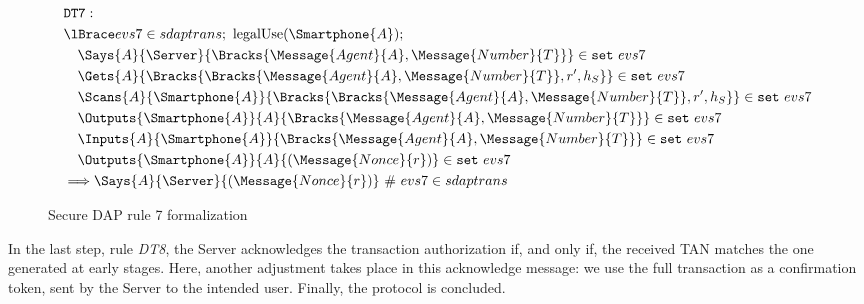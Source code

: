 \begin{figure}[!h]
  \begin{align*}
    & \texttt{DT7}: \newline \\
    & \lBrace evs7 \in sdaptrans;\ \text{legalUse}(\Smartphone{A}); \\
    & \quad \Says{A}{\Server}{\Bracks{\Message{Agent}{A}, \Message{Number}{T}}} \in \texttt{set} \ evs7 \\
    & \quad \Gets{A}{\Bracks{\Bracks{\Message{Agent}{A}, \Message{Number}{T}}, r', h_S}} \in \texttt{set} \ evs7 \\
    & \quad \Scans{A}{\Smartphone{A}}{\Bracks{\Bracks{\Message{Agent}{A}, \Message{Number}{T}}, r', h_S}} \in \texttt{set} \ evs7 \\
    & \quad \Outputs{\Smartphone{A}}{A}{\Bracks{\Message{Agent}{A}, \Message{Number}{T}}} \in \texttt{set} \ evs7 \\
    & \quad \Inputs{A}{\Smartphone{A}}{\Bracks{\Message{Agent}{A}, \Message{Number}{T}}} \in \texttt{set} \ evs7 \\
    & \quad \Outputs{\Smartphone{A}}{A}{(\Message{Nonce}{r})} \in \texttt{set} \ evs7 \\
    & \Longrightarrow \Says{A}{\Server}{(\Message{Nonce}{r})} \ \# \ evs7 \in sdaptrans
  \end{align*}
  \label{fig:dap-model-7}
  \caption{Secure DAP rule 7 formalization}
\end{figure}

In the last step, rule \textit{DT8}, the Server acknowledges the transaction authorization if, and only if, the received TAN matches the one generated at early stages. Here, another adjustment takes place in this acknowledge message: we use the full transaction as a confirmation token, sent by the Server to the intended user. Finally, the protocol is concluded.

